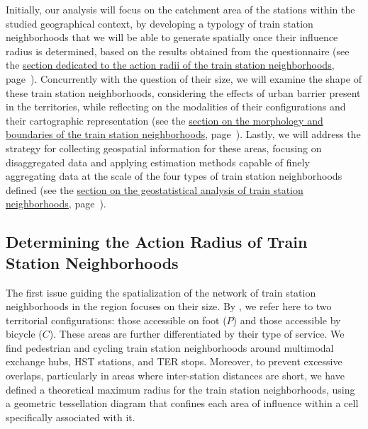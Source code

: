 \begin{refsegment}
Initially, our analysis will focus on the catchment area of the stations within the studied geographical context, by developing a typology of train station neighborhoods that we will be able to generate spatially once their influence radius is determined, based on the results obtained from the questionnaire (see the \hyperref[chap3:quartiers-gare-distances]{section dedicated to the action radii of the train station neighborhoods}, page~\pageref{chap3:quartiers-gare-distances}). Concurrently with the question of their size, we will examine the shape of these train station neighborhoods, considering the effects of \gls{urban barrier} present in the territories, while reflecting on the modalities of their configurations and their cartographic representation (see the \hyperref[chap3:quartiers-gare-formes]{section on the morphology and boundaries of the train station neighborhoods}, page~\pageref{chap3:quartiers-gare-formes}). Lastly, we will address the strategy for collecting geospatial information for these areas, focusing on disaggregated data and applying estimation methods capable of finely aggregating data at the scale of the four types of train station neighborhoods defined (see the \hyperref[chap3:quartiers-gare-analyse-geostatistique]{section on the geostatistical analysis of train station neighborhoods}, page~\pageref{chap3:quartiers-gare-analyse-geostatistique}).%

\subsection{Determining the Action Radius of Train Station Neighborhoods
    \label{chap3:quartiers-gare-distances}
    }

The first issue guiding the spatialization of the network of train station neighborhoods in the region focuses on their size. By , we refer here to two territorial configurations: those accessible on foot (\(P\)) and those accessible by bicycle (\(C\)). These areas are further differentiated by their type of service. We find pedestrian and cycling train station neighborhoods around multimodal exchange hubs, \acrshort{HST} stations, and \acrshort{TER} stops. Moreover, to prevent excessive overlaps, particularly in areas where inter-station distances are short, we have defined a theoretical maximum radius for the train station neighborhoods, using a geometric tessellation diagram that confines each area of influence within a cell specifically associated with it.%


\end{refsegment}
